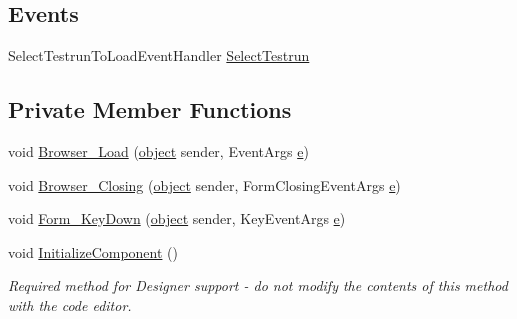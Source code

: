 \subsection*{Events}
\begin{DoxyCompactItemize}
\item 
Select\+Testrun\+To\+Load\+Event\+Handler \hyperlink{class_web_analyzer_1_1_u_i_1_1_select_testrun_form_a21a81e06c20de7a18979a8c4c7ded945}{Select\+Testrun}
\end{DoxyCompactItemize}
\subsection*{Private Member Functions}
\begin{DoxyCompactItemize}
\item 
void \hyperlink{class_web_analyzer_1_1_u_i_1_1_select_testrun_form_ab100b6ebd08abe54abbf7ca28cebe208}{Browser\+\_\+\+Load} (\hyperlink{_u_i_2_h_t_m_l_resources_2js_2lib_2underscore_8min_8js_aae18b7515bb2bc4137586506e7c0c903}{object} sender, Event\+Args \hyperlink{_u_i_2_h_t_m_l_resources_2js_2lib_2bootstrap_8min_8js_ab5902775854a8b8440bcd25e0fe1c120}{e})
\item 
void \hyperlink{class_web_analyzer_1_1_u_i_1_1_select_testrun_form_a40f5c7cebb25d60216d6d8a72ed80510}{Browser\+\_\+\+Closing} (\hyperlink{_u_i_2_h_t_m_l_resources_2js_2lib_2underscore_8min_8js_aae18b7515bb2bc4137586506e7c0c903}{object} sender, Form\+Closing\+Event\+Args \hyperlink{_u_i_2_h_t_m_l_resources_2js_2lib_2bootstrap_8min_8js_ab5902775854a8b8440bcd25e0fe1c120}{e})
\item 
void \hyperlink{class_web_analyzer_1_1_u_i_1_1_select_testrun_form_a89c5e39e7789c47ce7a31e78062c32ae}{Form\+\_\+\+Key\+Down} (\hyperlink{_u_i_2_h_t_m_l_resources_2js_2lib_2underscore_8min_8js_aae18b7515bb2bc4137586506e7c0c903}{object} sender, Key\+Event\+Args \hyperlink{_u_i_2_h_t_m_l_resources_2js_2lib_2bootstrap_8min_8js_ab5902775854a8b8440bcd25e0fe1c120}{e})
\item 
void \hyperlink{class_web_analyzer_1_1_u_i_1_1_select_testrun_form_a50e53d717d980bb138383b0faf77c462}{Initialize\+Component} ()
\begin{DoxyCompactList}\small\item\em Required method for Designer support -\/ do not modify the contents of this method with the code editor. \end{DoxyCompactList}\end{DoxyCompactItemize}
